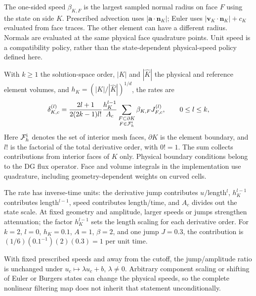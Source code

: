 The one-sided speed $\beta_{K,F}$ is the largest sampled normal radius on
face $F$ using the state on side $K$. Prescribed advection uses
$|\boldsymbol a\cdot\boldsymbol n_K|$; Euler uses
$|\boldsymbol v_K\cdot\boldsymbol n_K|+c_K$ evaluated from face traces.
The other element can have a different radius. Normals are evaluated at the
same physical face quadrature points. Unit speed is a compatibility policy,
rather than the state-dependent physical-speed policy defined here.

With $k\geq1$ the solution-space order, $|K|$ and $|\widehat K|$ the
physical and reference element volumes, and
$h_K=(|K|/|\widehat K|)^{1/d}$, the rates are
\begin{equation}
 \delta_{K,c}^{(l)}=
 \frac{2l+1}{2(2k-1)l!}\frac{h_K^{l-1}}{A_c}
 \sum_{\substack{F\subset\partial K\\F\in\mathcal F_h^{\rm i}}}
 \beta_{K,F}J_{F,c}^{(l)},\qquad 0\leq l\leq k,
 \label{eq:ofdg-damping-rate}
\end{equation}
Here $\mathcal F_h^{\rm i}$ denotes the set of interior mesh faces,
$\partial K$ is the element boundary, and $l!$ is the factorial of the total
derivative order, with $0!=1$. The sum collects contributions from interior
faces of $K$ only. Physical boundary conditions
belong to the DG flux operator. Face and volume integrals in the implementation
use quadrature, including geometry-dependent weights on curved cells.

The rate has inverse-time units: the derivative jump contributes $u/$length$^l$,
$h_K^{l-1}$ contributes length$^{l-1}$, speed contributes length/time, and
$A_c$ divides out the state scale. At fixed geometry and amplitude, larger speeds or jumps strengthen
attenuation; the factor $h_K^{l-1}$ sets the length scaling for each derivative order. For $k=2$, $l=0$, $h_K=0.1$, $A=1$,
$\beta=2$, and one jump $J=0.3$, the contribution is
$(1/6)(0.1^{-1})(2)(0.3)=1$ per unit time.

With fixed prescribed speeds and away from the cutoff, the jump/amplitude
ratio is unchanged under $u_c\mapsto\lambda u_c+b$, $\lambda\ne0$.
Arbitrary component scaling or shifting of Euler or Burgers states can change
the physical speeds, so the complete nonlinear filtering map does not inherit
that statement unconditionally.

